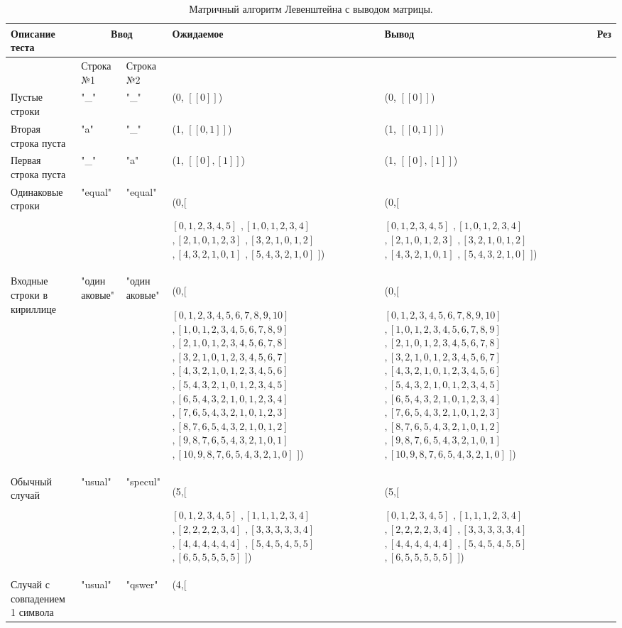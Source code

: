 \documentclass[12pt]{report}
\begin{document}
\begin{center}
\begin{longtable}[H]{|p{2cm}|p{1.5cm}|p{1.5cm}|p{4.7cm}|p{4.7cm}|c|}
	\caption{\label{tab:test4} Матричный алгоритм Левенштейна с выводом матрицы.}\\
	\hline
	Описание теста & \multicolumn{2}{|c|}{Ввод} & Ожидаемое & Вывод & Рез\\
	\hline
	& Строка №1 & Строка №2 & & & \\
	\hline
	Пустые строки & "\_" & "\_" & (0, $[[0]]$) & (0, $[[0]]$) & \checkmark\\
	\hline
	Вторая строка пуста & "a" & "\_" & (1, $[[0,1]]$) & (1, $[[0,1]]$) & \checkmark\\
	\hline
	Первая строка пуста & "\_" & "a" & (1, $[[0],[1]]$) & (1, $[[0],[1]]$) & \checkmark\\
	\hline
	Одинаковые строки & "equal" & "equal" & (0,[
	
	$[0,1,2,3,4,5]$
	$,[1,0,1,2,3,4]$
	$,[2,1,0,1,2,3]$
	$,[3,2,1,0,1,2]$
	$,[4,3,2,1,0,1]$
	$,[5,4,3,2,1,0]$
	]) & (0,[
	
	$[0,1,2,3,4,5]$
	$,[1,0,1,2,3,4]$
	$,[2,1,0,1,2,3]$
	$,[3,2,1,0,1,2]$
	$,[4,3,2,1,0,1]$
	$,[5,4,3,2,1,0]$
	]) & \checkmark\\
	\hline
	Входные строки в кириллице & "один
	аковые" & "один
	аковые" & (0,[
	
	$[0,1,2,3,4,5,6,7,8,9,10]$
	$,[1,0,1,2,3,4,5,6,7,8,9]$
	$,[2,1,0,1,2,3,4,5,6,7,8]$
	$,[3,2,1,0,1,2,3,4,5,6,7]$
	$,[4,3,2,1,0,1,2,3,4,5,6]$
	$,[5,4,3,2,1,0,1,2,3,4,5]$
	$,[6,5,4,3,2,1,0,1,2,3,4]$
	$,[7,6,5,4,3,2,1,0,1,2,3]$
	$,[8,7,6,5,4,3,2,1,0,1,2]$
	$,[9,8,7,6,5,4,3,2,1,0,1]$
	$,[10,9,8,7,6,5,4,3,2,1,0]$
	]) & (0,[
	
	$[0,1,2,3,4,5,6,7,8,9,10]$
	$,[1,0,1,2,3,4,5,6,7,8,9]$
	$,[2,1,0,1,2,3,4,5,6,7,8]$
	$,[3,2,1,0,1,2,3,4,5,6,7]$
	$,[4,3,2,1,0,1,2,3,4,5,6]$
	$,[5,4,3,2,1,0,1,2,3,4,5]$
	$,[6,5,4,3,2,1,0,1,2,3,4]$
	$,[7,6,5,4,3,2,1,0,1,2,3]$
	$,[8,7,6,5,4,3,2,1,0,1,2]$
	$,[9,8,7,6,5,4,3,2,1,0,1]$
	$,[10,9,8,7,6,5,4,3,2,1,0]$
	]) & \checkmark\\
	\hline
	Обычный случай & "usual" & "specul" & (5,[
	
	$[0,1,2,3,4,5]$
	$,[1,1,1,2,3,4]$
	$,[2,2,2,2,3,4]$
	$,[3,3,3,3,3,4]$
	$,[4,4,4,4,4,4]$
	$,[5,4,5,4,5,5]$
	$,[6,5,5,5,5,5]$
	]) & (5,[
	
	$[0,1,2,3,4,5]$
	$,[1,1,1,2,3,4]$
	$,[2,2,2,2,3,4]$
	$,[3,3,3,3,3,4]$
	$,[4,4,4,4,4,4]$
	$,[5,4,5,4,5,5]$
	$,[6,5,5,5,5,5]$
	]) & \checkmark\\
	\hline
	Случай с совпадением 1 символа & "usual" & "qswer" & (4,[
	

\end{longtable}
\end{center}
\end{document}
